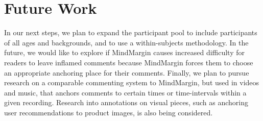 \section{Future Work}

In our next steps, we plan to expand the participant pool to include participants of all ages and backgrounds, and to use a within-subjects methodology. In the future, we would like to explore if MindMargin causes increased difficulty for readers to leave inflamed comments because MindMargin forces them to choose an appropriate anchoring place for their comments. Finally, we plan to pursue research on a comparable commenting system to MindMargin, but used in videos and music, that anchors comments to certain times or time-intervals within a given recording. Research into annotations on visual pieces, such as anchoring user recommendations to product images, is also being considered.